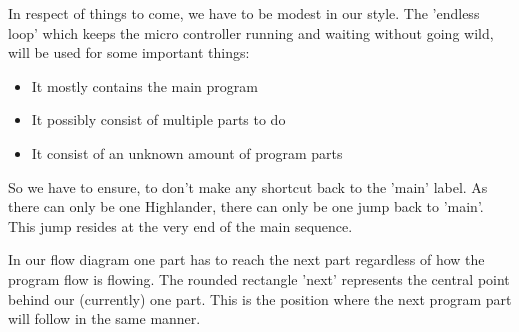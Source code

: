 In respect of things to come, we have to be modest in our style. The 'endless loop' which keeps the micro controller running and waiting without going wild, will be used for some important things:

\begin{itemize}
  \item It mostly contains the main program
  \item It possibly consist of multiple parts to do
  \item It consist of an unknown amount of program parts
\end{itemize}

So we have to ensure, to don't make any shortcut back to the 'main' label. As there can only be one Highlander, there can only be one jump back to 'main'. This jump resides at the very end of the main sequence.

In our flow diagram one part has to reach the next part regardless of how the program flow is flowing. The rounded rectangle 'next' represents the central point behind our (currently) one part. This is the position where the next program part will follow in the same manner.

